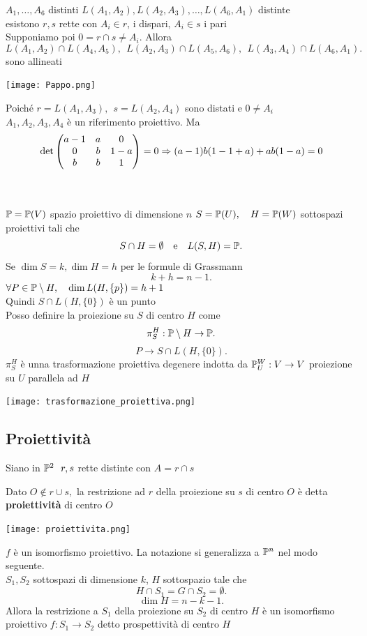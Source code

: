 \documentclass[12px]{article}
\begin{document}
	\begin{teo}[Pappo]
	$A_1,\ldots,A_6$ distinti $L(A_1,A_2),L(A_2,A_3),\ldots,L(A_6,A_1)$ distinte\\
	esistono $r,s$ rette con $A_i\in r$, i dispari, $A_i\in s$ i pari\\
	Supponiamo poi $0=r\cap s\neq A_i.$ Allora 
	\[
	L(A_1,A_2)\cap L(A_4,A_5), \ \ L(A_2,A_3)\cap L(A_5,A_6),\ \ L(A_3,A_4)\cap L(A_6,A_1)
	.\] 
	sono allineati
\end{teo}
\begin{center}
	\texttt{[image: Pappo.png]}
\end{center}
\begin{dimo}
	Poiché $r = L(A_1,A_3),\ \ s=L(A_2,A_4)$ sono distati e $0\neq A_i$\\
	$A_1,A_2,A_3,A_4$ è un riferimento proiettivo. Ma
	\[
		\det\begin{pmatrix}a-1 & a & 0 \\ 0 &b &1 - a\\ b & b & 1\end{pmatrix} = 0 \Rightarrow  (a-1)b(1-1+a)+ab(1-a)=0
	\] 

\end{dimo}

\ \\ \hline \ \\
 $\mathbb{P}=\mathbb{P}(V)$ spazio proiettivo di dimensione $n$ $S = \mathbb{P} (U),\ \ \ H = \mathbb{P}(W)$ sottospazi proiettivi tali che 
 \[
  S\cap H = \emptyset \ \ \text{ e} \ \ \ L(S,H)=\mathbb{P}
 .\] 
 Se $\dim S = k, \dim H = h$ per le formule di Grassmann
  \[
 k + h = n-1
 .\] 
$\forall P\in \mathbb{P}\setminus H, \ \ \ \dim L(H,\{p\})=h+1$\\
Quindi $S\cap L(H,\{0\}) $ è un punto\\
Posso definire la proiezione su  $S$ di centro $H$ come
\[
 \pi^H_S: \mathbb{P}\setminus H \rightarrow \mathbb{P}
.\] 
\[
	P \rightarrow S\cap L(H,\{0\})
.\] 
$\pi^H_S$ è unna trasformazione proiettiva degenere indotta da $\mathbb{P}^W_U :V \rightarrow V$ proiezione su $U$ parallela ad $H$\\
\begin{center}
	\texttt{[image: trasformazione\_proiettiva.png]}
\end{center}
\newpage
 \subsection{Proiettività}
 Siano in $\mathbb{P}^2\ \ r,s$ rette distinte con $A = r\cap s$
  \begin{defi}
 	Dato $O\not\in r\cup s,$ la restrizione ad $r$ della proiezione su $s$ di centro $O$ è detta  \textbf{proiettività} di centro $O$
\end{defi}
\begin{center}
	\texttt{[image: proiettivita.png]}
\end{center}
$f$ è un isomorfismo proiettivo. La notazione si generalizza a $\mathbb{P}^n$ nel modo seguente.\\
$S_1,S_2$ sottospazi di dimensione $k$, $H$ sottospazio tale che \[
H\cap S_1 = G\cap S_2 = \emptyset
.\] 
\[
\dim H = n  - k - 1
.\] Allora la restrizione a $S_1$ della proiezione su $S_2$ di centro $H$ è un isomorfismo proiettivo $f: S_1 \rightarrow S_2 $ detto prospettività di centro $H$
\newpage
\end{document}
